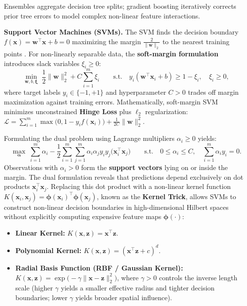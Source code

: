 \documentclass[11pt,a4paper]{article}
\begin{document}
	\begin{practicebox}

		Ensembles aggregate decision tree splits; gradient boosting iteratively corrects prior tree errors to model complex non-linear feature interactions.
	\end{practicebox}

	\textbf{Support Vector Machines (SVMs).} The SVM finds the decision boundary $f(\mathbf{x}) = \mathbf{w}^{\!\top}\mathbf{x} + b = 0$ maximizing the margin $\frac{2}{\|\mathbf{w}\|_2}$ to the nearest training points \parencite{cortes1995}. For non-linearly separable data, the \textbf{soft-margin formulation} introduces slack variables $\xi_i \ge 0$:
	\begin{equation}
		\min_{\mathbf{w}, b, \boldsymbol{\xi}}\; \frac{1}{2}\|\mathbf{w}\|_2^2 + C \sum_{i=1}^{m} \xi_i \qquad \text{s.t.}\quad y_i(\mathbf{w}^{\!\top}\mathbf{x}_i + b) \ge 1 - \xi_i, \quad \xi_i \ge 0,
	\end{equation}
	where target labels $y_i \in \{-1, +1\}$ and hyperparameter $C > 0$ trades off margin maximization against training errors. Mathematically, soft-margin SVM minimizes unconstrained \textbf{Hinge Loss} plus $\ell_2$ regularization: $\mathcal{L} = \sum_{i=1}^m \max\bigl(0, 1 - y_i f(\mathbf{x}_i)\bigr) + \frac{1}{2C}\|\mathbf{w}\|_2^2$.

	Formulating the dual problem using Lagrange multipliers $\alpha_i \ge 0$ yields:
	\begin{equation}
		\max_{\boldsymbol{\alpha}}\; \sum_{i=1}^{m} \alpha_i - \frac{1}{2}\sum_{i=1}^{m}\sum_{j=1}^{m} \alpha_i \alpha_j y_i y_j \bigl(\mathbf{x}_i^{\!\top}\mathbf{x}_j\bigr) \qquad \text{s.t.}\quad 0 \le \alpha_i \le C, \quad \sum_{i=1}^{m} \alpha_i y_i = 0.
	\end{equation}
	Observations with $\alpha_i > 0$ form the \textbf{support vectors} lying on or inside the margin. The dual formulation reveals that predictions depend exclusively on dot products $\mathbf{x}_i^{\!\top}\mathbf{x}_j$. Replacing this dot product with a non-linear kernel function $K(\mathbf{x}_i, \mathbf{x}_j) = \boldsymbol{\phi}(\mathbf{x}_i)^{\!\top}\boldsymbol{\phi}(\mathbf{x}_j)$, known as the \textbf{Kernel Trick}, allows SVMs to construct non-linear decision boundaries in high-dimensional Hilbert spaces without explicitly computing expensive feature maps $\boldsymbol{\phi}(\cdot)$:
	\begin{itemize}[nosep]
		\item \textbf{Linear Kernel:} $K(\mathbf{x}, \mathbf{z}) = \mathbf{x}^{\!\top}\mathbf{z}$.
		\item \textbf{Polynomial Kernel:} $K(\mathbf{x}, \mathbf{z}) = (\mathbf{x}^{\!\top}\mathbf{z} + c)^d$.
		\item \textbf{Radial Basis Function (RBF / Gaussian Kernel):} $K(\mathbf{x}, \mathbf{z}) = \exp\bigl(-\gamma \|\mathbf{x} - \mathbf{z}\|_2^2\bigr)$, where $\gamma > 0$ controls the inverse length scale (higher $\gamma$ yields a smaller effective radius and tighter decision boundaries; lower $\gamma$ yields broader spatial influence).
	\end{itemize}
\end{document}
